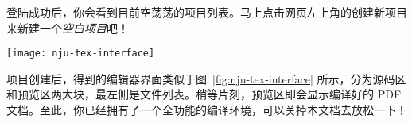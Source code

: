 登陆成功后，你会看到目前空荡荡的项目列表。马上点击网页左上角的\textcolor{olgreen}{创建新项目}来新建一个\emph{空白项目}吧！

\begin{figure*}[htbp]
  \caption{编辑器主界面，鼠标悬停在网页中相关图标上会显示说明。}
  \label{fig:nju-tex-interface}
  \texttt{[image: nju-tex-interface]}
\end{figure*}

项目创建后，得到的编辑器界面类似于图~\ref{fig:nju-tex-interface} 所示，分为源码区和预览区两大块，最左侧是文件列表。稍等片刻，预览区即会显示编译好的 PDF 文档。至此，你已经拥有了一个全功能的编译环境，可以关掉本文档去放松一下！
